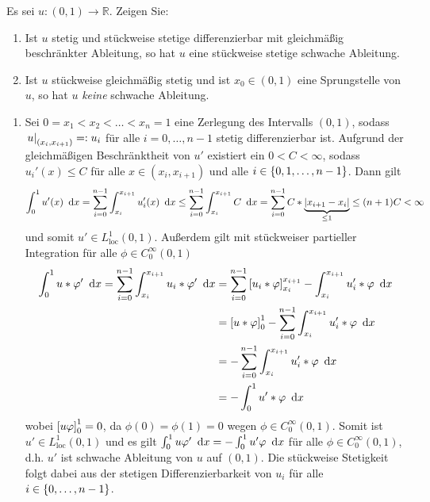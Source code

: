 \begin{exercisePage}
	
	\setcounter{taskcount}{27}
	
	\begin{task}
		Es sei $u\colon (0,1) \to \mathbb R$. Zeigen Sie:
		\begin{enumerate}
			\item Ist $u$ stetig und stückweise stetige differenzierbar mit gleichmäßig beschränkter Ableitung, so hat $u$ eine stückweise stetige schwache Ableitung.
			\item Ist $u$ stückweise gleichmäßig stetig und ist $x_0 \in (0,1)$ eine Sprungstelle von $u$, so hat $u$ \textit{keine} schwache Ableitung.
		\end{enumerate} 
	\end{task}
	
	\begin{enumerate}[label=(zu \alph*), leftmargin=*]
		\item Sei $0 = x_1 < x_2 < \dots < x_n = 1$ eine Zerlegung des Intervalls $(0,1)$, sodass $\left. u \right\vert_{(x_i, x_{i+1})} \mathrel{=:} u_i$ für alle $i = 0, \dots, n-1$ stetig differenzierbar ist. Aufgrund der gleichmäßigen Beschränktheit von $u'$ existiert ein $0 < C < \infty$, sodass $u_i'(x) \le C$ für alle $x \in (x_i, x_{i+1})$ und alle $i \in \left\{ 0, 1, \dots, n-1 \right\}$. Dann gilt
		\begin{equation*}
			\int_0^1 u'(x) \enskip \mathrm{d}x = \sum_{i=0}^{n-1} \int_{x_i}^{x_{i+1}} u_i'(x) \enskip \mathrm{d}x \le \sum_{i=0}^{n-1} \int_{x_i}^{x_{i+1}} C \enskip \mathrm{d}x = \sum_{i=0}^{n-1} C * \underbrace{\left| x_{i+1} - x_i \right|}_{\le 1} \le (n+1) C < \infty
		\end{equation*}
		und somit $u' \in L^1_{\text{loc}}(0,1)$. Außerdem gilt mit stückweiser partieller Integration für alle $\phi \in C_0^\infty(0,1)$
		\begin{equation*}
			\begin{aligned}
				\int_0^1 u * \varphi' \enskip \mathrm{d}x 
				= \sum_{i=0}^{n-1} \int_{x_i}^{x_{i+1}} u_i * \varphi' \enskip \mathrm{d}x 
				&= \sum_{i=0}^{n-1} \left[ u_i * \varphi \right]_{x_i}^{x_{i+1}} - \int_{x_i}^{x_{i+1}} u_i' * \varphi \enskip \mathrm{d}x \\
				&= \left[ u * \varphi \right]_0^1 - \sum_{i=0}^{n-1} \int_{x_i}^{x_{i+1}} u_i' * \varphi \enskip \mathrm{d}x \\ 
				&= - \sum_{i=0}^{n-1} \int_{x_i}^{x_{i+1}} u_i' * \varphi \enskip \mathrm{d}x \\
				&= - \int_0^1 u' * \varphi \enskip \mathrm{d}x
			\end{aligned}
		\end{equation*}
		wobei $\left[ u \varphi \right]_0^1 = 0$, da $\phi(0) = \phi(1) = 0$ wegen $\phi \in C_0^\infty(0,1)$.
		Somit ist $u' \in L_{\text{loc}}^1(0,1)$ und es gilt $\int_0^1 u \varphi' \enskip \mathrm{d}x = - \int_0^1 u' \varphi \enskip \mathrm{d}x$ für alle $\phi \in C_0^\infty(0,1)$, d.h. $u'$ ist schwache Ableitung von $u$ auf $(0,1)$. Die stückweise Stetigkeit folgt dabei aus der stetigen Differenzierbarkeit von $u_i$ für alle $i \in \left\{ 0, \dots, n-1 \right\}$.
		

\end{enumerate}
\end{exercisePage}
